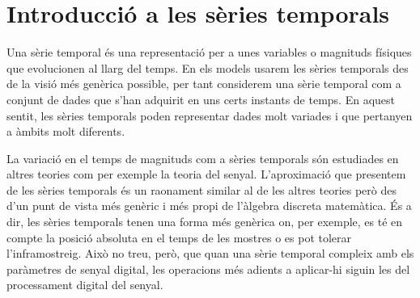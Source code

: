 






\section{Introducció a les sèries temporals}


Una sèrie temporal és una representació per a unes variables o
magnituds físiques que evolucionen al llarg del temps.  En els models
usarem les sèries temporals des de la visió més genèrica possible, per
tant considerem una sèrie temporal com a conjunt de dades que s'han
adquirit en uns certs instants de temps.  En aquest sentit, les sèries
temporals poden representar dades molt variades i que pertanyen a
àmbits molt diferents.


La variació en el temps de magnituds com a sèries temporals són
estudiades en altres teories com per exemple la teoria del senyal.%
L'aproximació que presentem de les sèries temporals és un raonament
similar al de les altres teories però des d'un punt de vista més
genèric i més propi de l'àlgebra discreta matemàtica.  És a dir,
les sèries temporals tenen una forma més genèrica on, per exemple, es
 té en compte la posició absoluta en el temps de les mostres o
es pot tolerar l'inframostreig.  Això no treu, però, que quan una
sèrie temporal compleix amb els paràmetres de senyal digital, les
operacions més adients a aplicar-hi siguin les del processament
digital del senyal.

